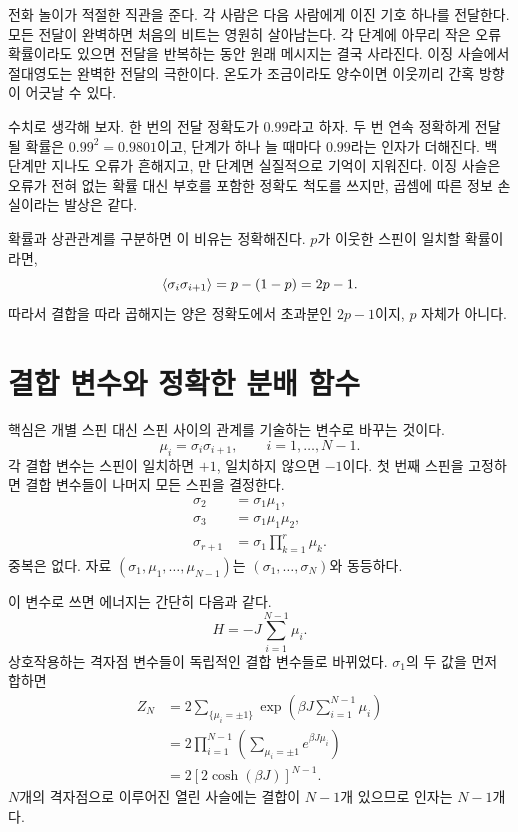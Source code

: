 전화 놀이가 적절한 직관을 준다. 각 사람은 다음 사람에게 이진 기호 하나를 전달한다. 모든 전달이 완벽하면 처음의 비트는 영원히 살아남는다. 각 단계에 아무리 작은 오류 확률이라도 있으면 전달을 반복하는 동안 원래 메시지는 결국 사라진다. 이징 사슬에서 절대영도는 완벽한 전달의 극한이다. 온도가 조금이라도 양수이면 이웃끼리 간혹 방향이 어긋날 수 있다.

수치로 생각해 보자. 한 번의 전달 정확도가 \(0.99\)라고 하자. 두 번 연속 정확하게 전달될 확률은 \(0.99^2=0.9801\)이고, 단계가 하나 늘 때마다 \(0.99\)라는 인자가 더해진다. 백 단계만 지나도 오류가 흔해지고, 만 단계면 실질적으로 기억이 지워진다. 이징 사슬은 오류가 전혀 없는 확률 대신 부호를 포함한 정확도 척도를 쓰지만, 곱셈에 따른 정보 손실이라는 발상은 같다.

확률과 상관관계를 구분하면 이 비유는 정확해진다. \(p\)가 이웃한 스핀이 일치할 확률이라면,
\begin{equation}
\left\langle\sigma_i\sigma_{i+1}\right\rangle
=p-(1-p)=2p-1.
\end{equation}
따라서 결합을 따라 곱해지는 양은 정확도에서 초과분인 \(2p-1\)이지, \(p\) 자체가 아니다.

\section{결합 변수와 정확한 분배 함수}

핵심은 개별 스핀 대신 스핀 사이의 관계를 기술하는 변수로 바꾸는 것이다.
\begin{equation}
\mu_i=\sigma_i\sigma_{i+1},
\qquad i=1,\ldots,N-1.
\label{eq:bond-variable}
\end{equation}
각 결합 변수는 스핀이 일치하면 \(+1\), 일치하지 않으면 \(-1\)이다. 첫 번째 스핀을 고정하면 결합 변수들이 나머지 모든 스핀을 결정한다.
\begin{align}
\sigma_2&=\sigma_1\mu_1,\\
\sigma_3&=\sigma_1\mu_1\mu_2,\\
\sigma_{r+1}&=\sigma_1\prod_{k=1}^{r}\mu_k.
\end{align}
중복은 없다. 자료 \((\sigma_1,\mu_1,\ldots,\mu_{N-1})\)는 \((\sigma_1,\ldots,\sigma_N)\)와 동등하다.

이 변수로 쓰면 에너지는 간단히 다음과 같다.
\begin{equation}
H=-J\sum_{i=1}^{N-1}\mu_i.
\end{equation}
상호작용하는 격자점 변수들이 독립적인 결합 변수들로 바뀌었다. \(\sigma_1\)의 두 값을 먼저 합하면
\begin{align}
Z_N
&=2\sum_{\{\mu_i=\pm1\}}
\exp\left(\beta J\sum_{i=1}^{N-1}\mu_i\right)\\
&=2\prod_{i=1}^{N-1}
\left(\sum_{\mu_i=\pm1}e^{\beta J\mu_i}\right)\\
&=2\left[2\cosh(\beta J)\right]^{N-1}.
\label{eq:chain-partition}
\end{align}
\(N\)개의 격자점으로 이루어진 열린 사슬에는 결합이 \(N-1\)개 있으므로 인자는 \(N-1\)개다.

